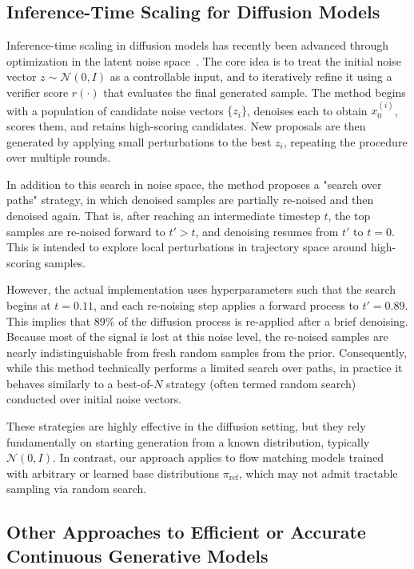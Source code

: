 \documentclass{article}
\begin{document}
\subsection{Inference-Time Scaling for Diffusion Models}

Inference-time scaling in diffusion models has recently been advanced through optimization in the latent noise space~\cite{ma2025diffits}. The core idea is to treat the initial noise vector \( z \sim \mathcal{N}(0, I) \) as a controllable input, and to iteratively refine it using a verifier score \( r(\cdot) \) that evaluates the final generated sample. The method begins with a population of candidate noise vectors \( \{z_i\} \), denoises each to obtain \( x_0^{(i)} \), scores them, and retains high-scoring candidates. New proposals are then generated by applying small perturbations to the best \( z_i \), repeating the procedure over multiple rounds.

In addition to this search in noise space, the method proposes a "search over paths" strategy, in which denoised samples are partially re-noised and then denoised again. That is, after reaching an intermediate timestep \( t \), the top samples are re-noised forward to \( t' > t \), and denoising resumes from \( t' \) to \( t = 0 \). This is intended to explore local perturbations in trajectory space around high-scoring samples.

However, the actual implementation uses hyperparameters such that the search begins at \( t = 0.11 \), and each re-noising step applies a forward process to \( t' = 0.89 \). This implies that 89\% of the diffusion process is re-applied after a brief denoising. Because most of the signal is lost at this noise level, the re-noised samples are nearly indistinguishable from fresh random samples from the prior. Consequently, while this method technically performs a limited search over paths, in practice it behaves similarly to a best-of-\( N \) strategy (often termed random search) conducted over initial noise vectors.

These strategies are highly effective in the diffusion setting, but they rely fundamentally on starting generation from a known distribution, typically \( \mathcal{N}(0, I) \). In contrast, our approach applies to flow matching models trained with arbitrary or learned base distributions \( \pi_{\mathrm{ref}} \), which may not admit tractable sampling via random search.

\subsection{Other Approaches to Efficient or Accurate Continuous Generative Models}
\end{document}
